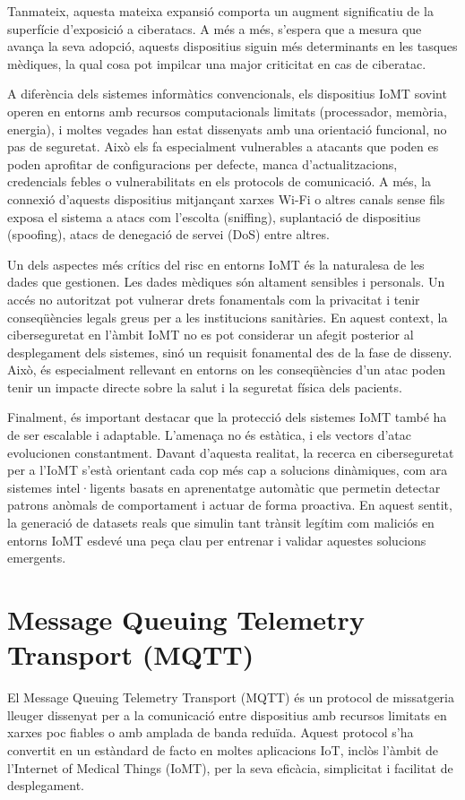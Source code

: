   Tanmateix, aquesta mateixa expansió comporta un augment significatiu de la superfície d’exposició a ciberatacs. A més a més, s’espera que a mesura que avança la seva adopció, aquests dispositius siguin més determinants en les tasques mèdiques, la qual cosa pot impilcar una major criticitat en cas de ciberatac. 
  
  A diferència dels sistemes informàtics convencionals, els dispositius IoMT sovint operen en entorns amb recursos computacionals limitats (processador, memòria, energia), i moltes vegades han estat dissenyats amb una orientació funcional, no pas de seguretat. Això els fa especialment vulnerables a atacants que poden es poden aprofitar de configuracions per defecte, manca d’actualitzacions, credencials febles o vulnerabilitats en els protocols de comunicació. A més, la connexió d’aquests dispositius mitjançant xarxes Wi-Fi o altres canals sense fils exposa el sistema a atacs com l’escolta (sniffing), suplantació de dispositius (spoofing), atacs de denegació de servei (DoS) entre altres. 
  
  Un dels aspectes més crítics del risc en entorns IoMT és la naturalesa de les dades que gestionen. Les dades mèdiques són altament sensibles i personals. Un accés no autoritzat pot vulnerar drets fonamentals com la privacitat i tenir conseqüències legals greus per a les institucions sanitàries. En aquest context, la ciberseguretat en l’àmbit IoMT no es pot considerar un afegit posterior al desplegament dels sistemes, sinó un requisit fonamental des de la fase de disseny. Això, és especialment rellevant en entorns on les conseqüències d’un atac poden tenir un impacte directe sobre la salut i la seguretat física dels pacients.
  
  Finalment, és important destacar que la protecció dels sistemes IoMT també ha de ser escalable i adaptable. L’amenaça no és estàtica, i els vectors d’atac evolucionen constantment. Davant d’aquesta realitat, la recerca en ciberseguretat per a l’IoMT s’està orientant cada cop més cap a solucions dinàmiques, com ara sistemes intel·ligents basats en aprenentatge automàtic que permetin detectar patrons anòmals de comportament i actuar de forma proactiva. En aquest sentit, la generació de datasets reals que simulin tant trànsit legítim com maliciós en entorns IoMT esdevé una peça clau per entrenar i validar aquestes solucions emergents. \cite{IoMTexp}
  
  \section{Message Queuing Telemetry Transport (MQTT)}
  El Message Queuing Telemetry Transport (MQTT) és un protocol de missatgeria lleuger dissenyat per a la comunicació entre dispositius amb recursos limitats en xarxes poc fiables o amb amplada de banda reduïda. Aquest protocol s’ha convertit en un estàndard de facto en moltes aplicacions IoT, inclòs l’àmbit de l’Internet of Medical Things (IoMT), per la seva eficàcia, simplicitat i facilitat de desplegament.
  

